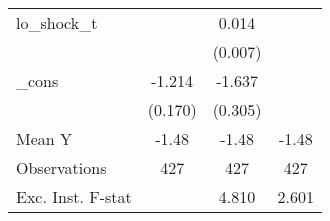 {\begin{tabular}{l*{3}{c}}
\addlinespace
lo\_shock\_t  &                     &       0.014\sym{**} &                     \\
            &                     &     (0.007)         &                     \\
\addlinespace
\_cons      &      -1.214\sym{***}&      -1.637\sym{***}&                     \\
            &     (0.170)         &     (0.305)         &                     \\
\midrule
Mean Y      &       -1.48         &       -1.48         &       -1.48         \\
Observations&         427         &         427         &         427         \\
Exc. Inst. F-stat&                     &       4.810         &       2.601         \\
\bottomrule
\end{tabular}
}

